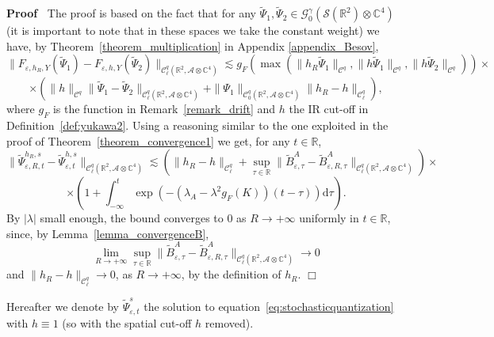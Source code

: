 \documentclass{article}
\newcommand{\mathd}{\mathrm{d}}
\newenvironment{proof}{\noindent\textbf{Proof\ }}{\hspace*{\fill}$\Box$\medskip}
\begin{document}
\begin{proof}
  The proof is based on the fact that for any $\tilde{\Psi}_1, \tilde{\Psi}_2
  \in \mathcal{} \mathcal{G}^{\gamma}_0 (\mathcal{S} (\mathbb{R}^2) \otimes
  \mathbb{C}^4)$ (it is important to note that in these spaces we take the
  constant weight) we have, by Theorem~\ref{theorem_multiplication} in
  Appendix \ref{appendix_Besov},
  \[ \| F_{\varepsilon, h_R, Y} (\tilde{\Psi}_1) - F_{\varepsilon, h, Y}
     (\tilde{\Psi}_2) \|_{\mathcal{C}^q_{\ell} (\mathbb{R}^2, \mathcal{A}
     \otimes \mathbb{C}^4)} \lesssim g_F (\max (\| h_R \tilde{\Psi}_1
     \|_{\mathcal{C}^q}, \| h \tilde{\Psi}_1 \|_{\mathcal{C}^q}, \| h
     \tilde{\Psi}_2 \|_{\mathcal{C}^q})) \times \]
  \begin{equation}
    \times (\| h \|_{\mathcal{C}^q} \| \tilde{\Psi}_1 - \tilde{\Psi}_2
    \|_{\mathcal{C}^q_{\ell} (\mathbb{R}^2, \mathcal{A} \otimes \mathbb{C}^4)}
    + \| \Psi_1 \|_{\mathcal{C}^q_0 (\mathbb{R}^2, \mathcal{A} \otimes
    \mathbb{C}^4)} \| h_R - h \|_{\mathcal{C}^q_{\ell}})
    \label{eq:inequalityh},
  \end{equation}
  where $g_F$ is the function in Remark~\ref{remark_drift} and $h$ the IR
  cut-off in Definition~\ref{def:yukawa2}. Using a reasoning similar to the
  one exploited in the proof of Theorem~\ref{theorem_convergence1} we get, for
  any $t \in \mathbb{R}$,
  \[ \| \tilde{\Psi}_{\varepsilon, R, t}^{h_R, s} -
     \tilde{\Psi}_{\varepsilon, t}^{h, s} \|_{\mathcal{C}^q_{\ell}
     (\mathbb{R}^2, \mathcal{A} \otimes \mathbb{C}^4)} \lesssim (\| h_R - h
     \|_{\mathcal{C}^q_{\ell}} + \sup_{\tau \in \mathbb{R}} \|
     \tilde{B}_{\varepsilon, \tau}^A - \tilde{B}^A_{\varepsilon, R, \tau}
     \|_{\mathcal{C}^q_{\ell} (\mathbb{R}^2, \mathcal{A} \otimes
     \mathbb{C}^4)}) \times \]
  \[ \times \left( 1 + \int_{- \infty}^t \exp (- (\lambda_A - \lambda^2 g_F
     (K)) (t - \tau)) \mathd \tau \right) . \]
  By $| \lambda |$ small enough, the bound converges to $0$ as $R \rightarrow
  + \infty$ uniformly in $t \in \mathbb{R}$, since, by
  Lemma~\ref{lemma_convergenceB},
  \[ \lim_{R \rightarrow + \infty} \sup_{\tau \in \mathbb{R}} \|
     \tilde{B}_{\varepsilon, \tau}^A - \tilde{B}^A_{\varepsilon, R, \tau}
     \|_{\mathcal{C}^q_{\ell} (\mathbb{R}^2, \mathcal{A} \otimes
     \mathbb{C}^4)} \rightarrow 0 \]
  and $\| h_R - h \|_{\mathcal{C}^q_{\ell}} \rightarrow 0$, as $R \rightarrow
  + \infty$, by the definition of $h_R$.
\end{proof}

Hereafter we denote by $\tilde{\Psi}_{\varepsilon, t}^s$ the solution to
equation~{\eqref{eq:stochasticquantization}} with $h \equiv 1$ (so with the
spatial cut-off $h$ removed).
\end{document}
